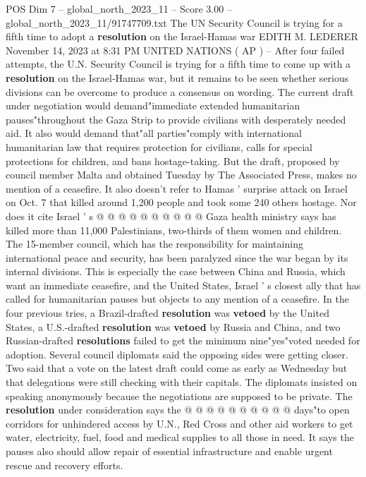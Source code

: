 \begin{textsample}{POS Dim 7 – global\_north\_2023\_11 – Score 3.00 – global\_north\_2023\_11/91747709.txt}  \label{ex:f7_pos_400}
The UN Security Council is trying for a fifth time to adopt a \textbf{resolution} on the Israel-Hamas war EDITH M.
LEDERER November 14, 2023 at 8:31 PM UNITED NATIONS ( AP ) -- After four failed attempts, the U.N.
Security Council is trying for a fifth time to come up with a \textbf{resolution} on the Israel-Hamas war, but it remains to be seen whether serious divisions can be overcome to produce a consensus on wording.
The current draft under negotiation would demand"immediate extended humanitarian pauses"throughout the Gaza Strip to provide civilians with desperately needed aid.
It also would demand that"all parties"comply with international humanitarian law that requires protection for civilians, calls for special protections for children, and bans hostage-taking.
But the draft, proposed by council member Malta and obtained Tuesday by The Associated Press, makes no mention of a ceasefire.
It also doesn't refer to Hamas ' surprise attack on Israel on Oct. 7 that killed around 1,200 people and took some 240 others hostage.
Nor does it cite Israel ' s @ @ @ @ @ @ @ @ @ @ Gaza health ministry says has killed more than 11,000 Palestinians, two-thirds of them women and children.
The 15-member council, which has the responsibility for maintaining international peace and security, has been paralyzed since the war began by its internal divisions.
This is especially the case between China and Russia, which want an immediate ceasefire, and the United States, Israel ' s closest ally that has called for humanitarian pauses but objects to any mention of a ceasefire.
In the four previous tries, a Brazil-drafted \textbf{resolution} was \textbf{vetoed} by the United States, a U.S.-drafted \textbf{resolution} was \textbf{vetoed} by Russia and China, and two Russian-drafted \textbf{resolutions} failed to get the minimum nine"yes"voted needed for adoption.
Several council diplomats said the opposing sides were getting closer.
Two said that a vote on the latest draft could come as early as Wednesday but that delegations were still checking with their capitals.
The diplomats insisted on speaking anonymously because the negotiations are supposed to be private.
The \textbf{resolution} under consideration says the @ @ @ @ @ @ @ @ @ @ days"to open corridors for unhindered access by U.N., Red Cross and other aid workers to get water, electricity, fuel, food and medical supplies to all those in need.
It says the pauses also should allow repair of essential infrastructure and enable urgent rescue and recovery efforts.

\end{textsample}
